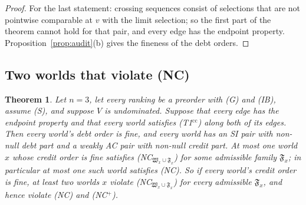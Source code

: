 \documentclass[11pt]{article}
\newtheorem{theorem}{Theorem}
\theoremstyle{definition}\newtheorem{definition}[theorem]{Definition}
\theoremstyle{remark}\newtheorem{remark}[theorem]{Remark}
\newcommand{\Tcc}{\textup{(T1$^{\mathrm{cc}}$)}}
\begin{document}
\begin{proof}
For the last statement: crossing sequences consist of selections that are
not pointwise comparable at $v$ with the limit selection; so the first part
of the theorem cannot hold for that pair, and every edge has the endpoint
property. Proposition~\ref{prop:audit}(b) gives the fineness of the debt
orders.
\end{proof}

\subsection{Two worlds that violate (NC)}\label{sec:twoNC}

\begin{theorem}\label{thm:twoNC}
Let $n=3$, let every ranking be a preorder with (G) and (IB), assume (S),
and suppose $V$ is undominated. Suppose that every edge has the endpoint
property and that every world satisfies \Tcc{} along both of its edges.
Then every world's debt order is fine, and every world has an SI pair with
non-null debt part and a weakly AC pair with non-null credit part. At most
one world $x$ whose credit order is fine satisfies (NC$_{\mathfrak W_x\cup
\mathfrak F_x}$) for some admissible family $\mathfrak F_x$; in particular
at most one such world satisfies (NC). So if every world's credit order is
fine, at least two worlds $x$ violate (NC$_{\mathfrak W_x\cup\mathfrak
F_x}$) for every admissible $\mathfrak F_x$, and hence violate (NC) and
(NC$^+$).
\end{theorem}
\end{document}
